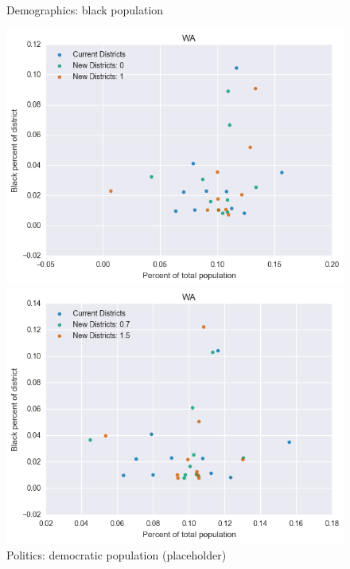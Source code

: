 \begin{figure}[htb!] \centering
\caption{ Demographics: black population }
\includegraphics[width=4.5in]{../analysis/WA/analysis_scatter.png}
\caption{ Politics: democratic population (placeholder)}
\includegraphics[width=4.5in]{../analysis/WA/analysis_scatter2.png}
\end{figure}

\clearpage
\newpage

